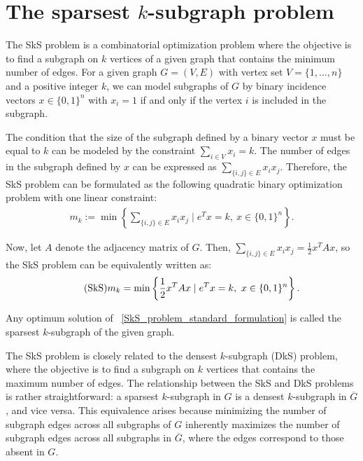 \documentclass{article}
\begin{document}
\section{The sparsest $k$-subgraph problem}\label{definitions}


The SkS problem is a combinatorial optimization problem where the objective is to find a subgraph on $k$ vertices of a given graph that contains the minimum number of edges. For a given graph $G = (V, E)$ with vertex set $V = \{1, \ldots, n\}$ and a positive integer $k$, we can model subgraphs of $G$ by binary incidence vectors $x\in\{0,1\}^n$ with $x_i=1$ if and only if the vertex $i$ is included in the subgraph. 

The condition that the size of the subgraph defined by a binary vector $x$ must be equal to $k$ can be modeled by the constraint $\sum_{i \in V} x_i=k$. The number of edges in the subgraph defined by $x$ can be expressed as $\sum_{\{i,j\} \in E} x_i x_j$. Therefore, the SkS problem can be formulated as the following quadratic binary optimization problem with one linear constraint:
\begin{align}\label{SkS_problem_standard_formulation_0}
     m_k:=\min \left\{ \sum_{\{i,j\} \in E} x_i x_j \mid e^T x = k, ~x \in \{0, 1\}^n \right\}.
\end{align}

Now, let $A$ denote the adjacency matrix of $G$. Then, $\sum_{\{i,j\} \in E} x_i x_j = \frac{1}{2}x^T A x$, so the SkS problem can be equivalently written as:
\begin{align}\label{SkS_problem_standard_formulation}
\tag{\mbox{SkS}}
m_k= \min \left\{ \frac{1}{2}x^T A x \mid e^T x = k, 
~x \in \{0, 1\}^n \right\}.
\end{align}

Any optimum solution of ~\eqref{SkS_problem_standard_formulation} is called the sparsest $k$-subgraph of the given graph.

The SkS problem is closely related to the densest $k$-subgraph (DkS) problem, where the objective is to find a subgraph on $k$ vertices that contains the maximum number of edges. 
The relationship between the SkS and DkS problems is rather straightforward: a sparsest $k$-subgraph in $G$ is a densest $k$-subgraph in $\overline{G}$, and vice versa. This equivalence arises because minimizing the number of subgraph edges across all subgraphs of $G$ inherently maximizes the number of subgraph edges across all subgraphs in $\overline{G}$, where the edges correspond to those absent in $G$. 
\end{document}
